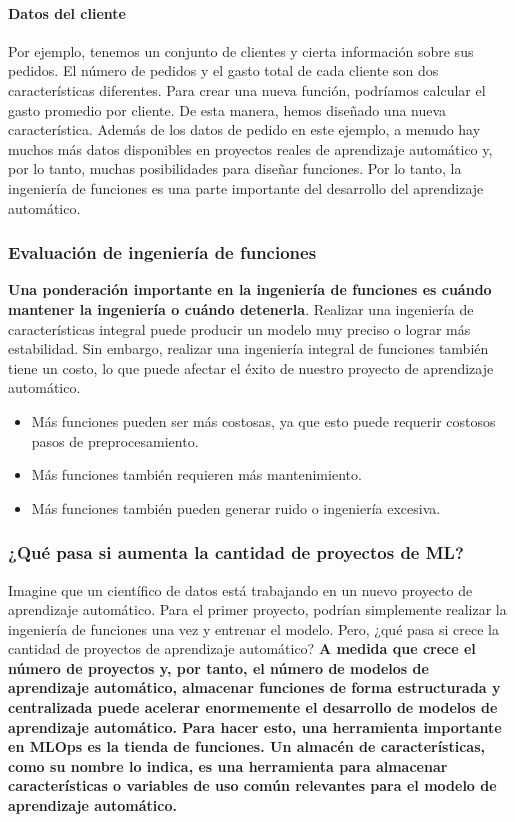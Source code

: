 \documentclass[10pt]{book}
\begin{document}
\paragraph{Datos del cliente}
Por ejemplo, tenemos un conjunto de clientes y cierta información sobre sus pedidos. El número de pedidos y el gasto total de cada cliente son dos características diferentes. Para crear una nueva función, podríamos calcular el gasto promedio por cliente. De esta manera, hemos diseñado una nueva característica. Además de los datos de pedido en este ejemplo, a menudo hay muchos más datos disponibles en proyectos reales de aprendizaje automático y, por lo tanto, muchas posibilidades para diseñar funciones. Por lo tanto, la ingeniería de funciones es una parte importante del desarrollo del aprendizaje automático.

\subsubsection{Evaluación de ingeniería de funciones}
\textbf{Una ponderación importante en la ingeniería de funciones es cuándo mantener la ingeniería o cuándo detenerla}. Realizar una ingeniería de características integral puede producir un modelo muy preciso o lograr más estabilidad. Sin embargo, realizar una ingeniería integral de funciones también tiene un costo, lo que puede afectar el éxito de nuestro proyecto de aprendizaje automático. 

\begin{itemize}
    \item Más funciones pueden ser más costosas, ya que esto puede requerir costosos pasos de preprocesamiento.
    \item Más funciones también requieren más mantenimiento.
    \item Más funciones también pueden generar ruido o ingeniería excesiva.
\end{itemize}

\subsubsection{¿Qué pasa si aumenta la cantidad de proyectos de ML?}
Imagine que un científico de datos está trabajando en un nuevo proyecto de aprendizaje automático. Para el primer proyecto, podrían simplemente realizar la ingeniería de funciones una vez y entrenar el modelo. Pero, ¿qué pasa si crece la cantidad de proyectos de aprendizaje automático? \textbf{A medida que crece el número de proyectos y, por tanto, el número de modelos de aprendizaje automático, almacenar funciones de forma estructurada y centralizada puede acelerar enormemente el desarrollo de modelos de aprendizaje automático. Para hacer esto, una herramienta importante en MLOps es la tienda de funciones. Un almacén de características, como su nombre lo indica, es una herramienta para almacenar características o variables de uso común relevantes para el modelo de aprendizaje automático.}
\end{document}
